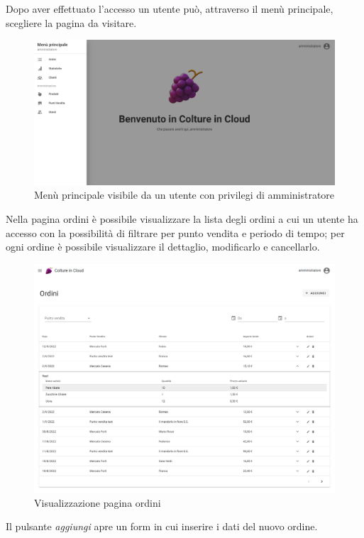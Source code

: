\documentclass[italian]{report}
\begin{document}
Dopo aver effettuato l'accesso un utente può, attraverso il menù principale, scegliere la pagina da visitare. 
\begin{figure}[htp]
    \centering
    \includegraphics[width=\textwidth]{assets/final_menu.png}
    \caption{Menù principale visibile da un utente con privilegi di amministratore}
    \label{fig:menu}
\end{figure}
\newpage
Nella pagina ordini è possibile visualizzare la lista degli ordini a cui un utente ha accesso con la possibilità di filtrare per punto vendita e periodo di tempo; per ogni ordine è possibile visualizzare il dettaglio, modificarlo e cancellarlo.
\begin{figure}[htp]
    \centering
    \includegraphics[width=\textwidth]{assets/final_orders.png}
    \caption{Visualizzazione pagina ordini}
    \label{fig:order_page}
\end{figure}
\newpage
Il pulsante \textit{aggiungi} apre un form in cui inserire i dati del nuovo ordine.
\end{document}
